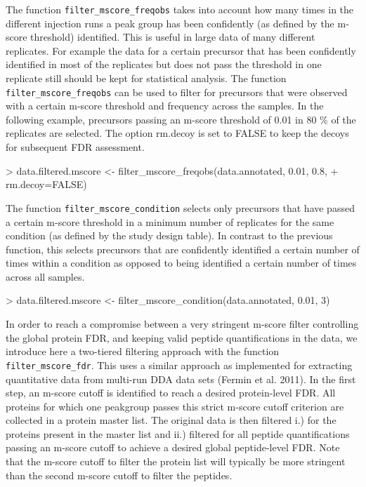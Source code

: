 \documentclass[a4paper]{article}
\begin{document}
The function \texttt{filter\_mscore\_freqobs} takes into account how many times in the different injection runs a peak group has been confidently (as defined by the m-score threshold) identified. This is useful in large data of many different replicates. For example the data for a certain precursor that has been confidently identified in most of the replicates but does not pass the threshold in one replicate still should be kept for statistical analysis. The function \texttt{filter\_mscore\_freqobs} can be used to filter for precursors that were observed with a certain m-score threshold and frequency across the samples. In the following example, precursors passing an m-score threshold of 0.01 in 80 \% of the replicates are selected. The option rm.decoy is set to FALSE to keep the decoys for subsequent FDR assessment.

\begin{Schunk}
\begin{Sinput}
> data.filtered.mscore <- filter_mscore_freqobs(data.annotated, 0.01, 0.8,
+                                               rm.decoy=FALSE)
\end{Sinput}
\end{Schunk}

The function \texttt{filter\_mscore\_condition} selects only precursors that have passed a certain m-score threshold in a minimum number of replicates for the same condition (as defined by the study design table). In contrast to the previous function, this selects precursors that are confidently identified a certain number of times within a condition as opposed to being identified a certain number of times across all samples.

\begin{Schunk}
\begin{Sinput}
> data.filtered.mscore <- filter_mscore_condition(data.annotated, 0.01, 3)
\end{Sinput}
\end{Schunk}


In order to reach a compromise between a very stringent m-score filter controlling the global protein FDR, and keeping valid peptide quantifications in the data, we introduce here a two-tiered filtering approach with the function \texttt{filter\_mscore\_fdr}. This uses a similar approach as implemented for extracting quantitative data from multi-run DDA data sets (Fermin et al. 2011). In the first step, an m-score cutoff is identified to reach a desired protein-level FDR. All proteins for which one peakgroup passes this strict m-score cutoff criterion are collected in a protein master list. The original data is then filtered i.) for the proteins present in the master list and ii.) filtered for all peptide quantifications passing an m-score cutoff to achieve a desired global peptide-level FDR. Note that the m-score cutoff to filter the protein list will typically be more stringent than the second m-score cutoff to filter the peptides.
\end{document}
